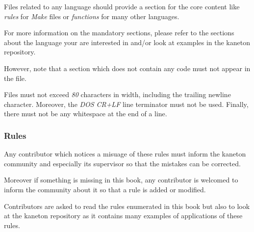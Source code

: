 Files related to any language should provide a section for the core
content like \textit{rules} for \textit{Make} files or \textit{functions}
for many other languages.

For more information on the mandatory sections, please refer to
the sections about the language your are interested in and/or look at
examples in the kaneton repository.

However, note that a section which does not contain any code must not
appear in the file.

Files must not exceed \textit{80} characters in width, including
the trailing newline character. Moreover, the \textit{DOS} \textit{CR+LF}
line terminator must not be used. Finally, there must not be any whitespace
at the end of a line.


\subsubsection{Rules}

Any contributor which notices a misuage of these rules must inform the
kaneton community and especially its supervisor so that the mistakes can be
corrected.

Moreover if something is missing in this book, any contributor is welcomed
to inform the community about it so that a rule is added or modified.

Contributors are asked to read the rules enumerated in this book but also
to look at the kaneton repository as it contains many examples of applications
of these rules.
